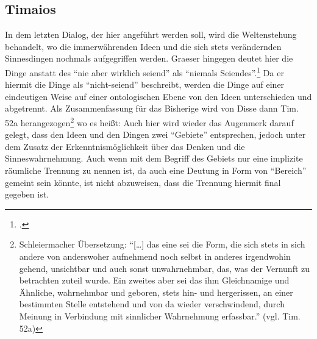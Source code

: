 \subsection{Timaios}
In dem letzten Dialog, der hier angeführt werden soll, wird die Weltenstehung behandelt, wo die immerwährenden Ideen und die sich stets verändernden Sinnesdingen nochmals aufgegriffen werden. 
 Graeser hingegen deutet hier die Dinge anstatt des \enquote{nie aber wirklich seiend} als \enquote{niemals Seiendes}.\footcite[vgl.][S. 140]{GraeserPhiloGeschichte} Da er hiermit die Dinge als \enquote{nicht-seiend} beschreibt, werden die Dinge auf einer eindeutigen Weise auf einer ontologischen Ebene von den Ideen unterschieden und abgetrennt.
Als Zusammenfassung für das Bisherige wird von Disse dann Tim. 52a herangezogen\footnote{Schleiermacher Übersetzung: \enquote{[\dots] das eine sei die Form, die sich stets in sich andere von anderswoher aufnehmend noch selbst in anderes irgendwohin gehend, unsichtbar und auch sonst unwahrnehmbar, das, was der Vernunft zu betrachten zuteil wurde. Ein zweites aber sei das ihm Gleichnamige und Ähnliche, wahrnehmbar und geboren, stets hin- und hergerissen, an einer bestimmten Stelle entstehend und von da wieder verschwindend, durch Meinung in Verbindung mit sinnlicher Wahrnehmung erfassbar.} (vgl. Tim. 52a)} wo es heißt:
Auch hier wird wieder das Augenmerk darauf gelegt, dass den Ideen und den Dingen zwei \enquote{Gebiete} entsprechen, jedoch unter dem Zusatz der Erkenntnismöglichkeit über das Denken und die Sinneswahrnehmung. Auch wenn mit dem Begriff des Gebiets nur eine implizite räumliche Trennung zu nennen ist, da auch eine Deutung in Form von \enquote{Bereich} gemeint sein könnte, ist nicht abzuweisen, dass die Trennung hiermit final gegeben ist.


